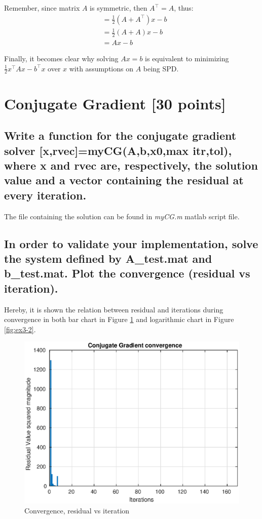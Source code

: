 \documentclass[unicode,11pt,a4paper,oneside,numbers=endperiod,openany]{scrartcl}
\begin{document}
Remember, since matrix $A$ is symmetric, then $A^\intercal = A$, thus:
\begin{align*}
     & = \frac{1}{2} (A + A^\intercal)x - b \\
     & = \frac{1}{2} (A + A)x - b           \\
     & = Ax - b
\end{align*}

Finally, it becomes clear why solving $Ax = b$ is equivalent to minimizing
$\frac{1}{2} x^\intercal A x - b^\intercal x$ over $x$ with assumptions on $A$ being SPD.


\section{Conjugate Gradient [30 points]}

\subsection{Write a function for the conjugate gradient solver
        [x,rvec]=myCG(A,b,x0,max itr,tol),
    where x and rvec are, respectively, the solution value and a vector
    containing the residual at every iteration.}

The file containing the solution can be found in \textit{myCG.m} matlab script file.

\subsection{In order to validate your implementation,
    solve the system defined by A\_test.mat and b\_test.mat.
    Plot the convergence (residual vs iteration).}

Hereby, it is shown the relation between residual and iterations during convergence
in both bar chart in Figure \ref{fig:ex3-2-bar} and logarithmic chart in Figure \ref{fig:ex3-2}.

\begin{figure}[H]
    \centering
    \caption{Convergence, residual vs iteration}
    \label{fig:ex3-2-bar}
    \includegraphics[width=\textwidth, trim={0cm 0cm 0cm 0cm}]{./figures/ex3-2-bar.eps}
\end{figure}
\end{document}
